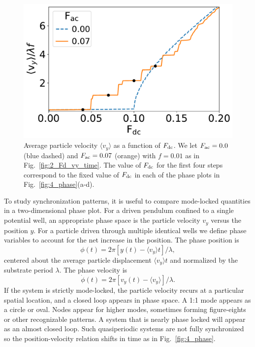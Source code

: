 \documentclass[preprint,showpacs,preprintnumbers,amsmath,amssymb,aps,prb]{revtex4-1}
\theoremstyle{remark}
\begin{document}
\begin{figure}[h]
\centering
\includegraphics[width=\columnwidth]{fig3_sweep_vyFDC.pdf}
\caption{Average particle velocity  $\langle v_{y} \rangle$
  as a function of $F_{\rm dc}$.
  We let
  $F_{\rm ac}=0.0$ (blue dashed) and 
  $F_{\rm ac}=0.07$ (orange) with $f = 0.01$ 
  as in Fig.~\ref{fig:2_Fd_vy_time}.
  The value of $F_{\rm dc}$ for the first four steps
  correspond to the fixed value of $F_{\rm dc}$
  in each of the phase plots
  in Fig.~\ref{fig:4_phase}(a-d).
}
\label{fig:3_sweep_vyFDC}
\end{figure}

  To study synchronization patterns, 
  it is useful to compare
  mode-locked quantities 
  in a two-dimensional phase plot. 
  For a driven pendulum confined to a single potential well,
  an appropriate
  phase space is the particle velocity $v_y$ versus the position $y$.  
  For a particle driven 
  through multiple identical wells 
  we define phase variables 
  to account for the net increase in the position.
  The phase position is
  \begin{equation}
    \phi(t) = 2\pi [y(t)-\langle v_y \rangle t]/\lambda,
  \end{equation}
  centered about the average particle displacement $\langle v_y \rangle t$
  and normalized by the substrate period $\lambda$.\cite{Juniper2015}
  The phase velocity is
  \begin{equation}
    \dot{\phi}(t) =2\pi [v_y(t)-\langle v_y \rangle] /\lambda.  
  \end{equation}
If the system
  is strictly mode-locked,
  the particle velocity
  recurs at a particular spatial location, and 
a closed loop appears in  
  phase space. 
  A 1:1 mode appears as a circle or oval. 
  Nodes appear 
  for higher modes,
  sometimes forming figure-eights
  or other recognizable patterns.
  A system that is nearly phase locked
  will appear as an almost closed loop.
  Such quasiperiodic systems are
  not fully synchronized
  so the position-velocity relation
  shifts in time as in Fig.~\ref{fig:4_phase}.
  
\end{document}
